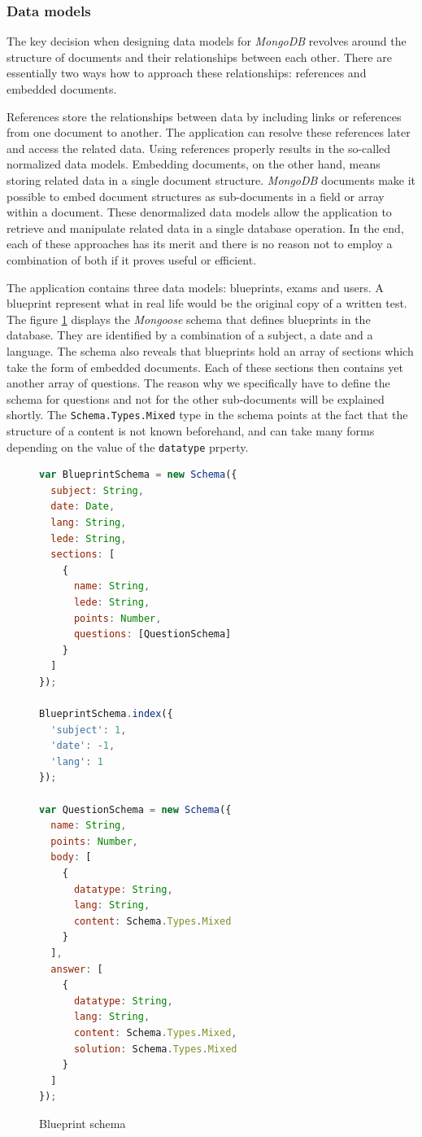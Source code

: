 \documentclass[thesis=M,english,hidelinks]{FITthesis}[2012/10/20]
\newcommand{\code}{\texttt}
\begin{document}
      \subsubsection{Data models}

The key decision when designing data models for \textit{MongoDB} revolves around the structure of documents and their relationships between each other. There are essentially two ways how to approach these relationships: references and embedded documents.

References store the relationships between data by including links or references from one document to another. The application can resolve these references later and access the related data. Using references properly results in the so-called normalized data models. Embedding documents, on the other hand, means storing related data in a single document structure. \textit{MongoDB} documents make it possible to embed document structures as sub-documents in a field or array within a document. These denormalized data models allow the application to retrieve and manipulate related data in a single database operation. In the end, each of these approaches has its merit and there is no reason not to employ a combination of both if it proves useful or efficient.

The application contains three data models: blueprints, exams and users. A blueprint represent what in real life would be the original copy of a written test. The figure \ref{fig:blueprint_schema} displays the \textit{Mongoose} schema that defines blueprints in the database. They are identified by a combination of a subject, a date and a language. The schema also reveals that blueprints hold an array of sections which take the form of embedded documents. Each of these sections then contains yet another array of questions. The reason why we specifically have to define the schema for questions and not for the other sub-documents will be explained shortly. The \code{Schema.Types.Mixed} type in the schema points at the fact that the structure of a content is not known beforehand, and can take many forms depending on the value of the \code{datatype} prperty.

\begin{figure}
  \begin{lstlisting}[language=JavaScript]
var BlueprintSchema = new Schema({
  subject: String,
  date: Date,
  lang: String,
  lede: String,
  sections: [
    {
      name: String,
      lede: String,
      points: Number,
      questions: [QuestionSchema]
    }
  ]
});

BlueprintSchema.index({
  'subject': 1,
  'date': -1,
  'lang': 1
});

var QuestionSchema = new Schema({
  name: String,
  points: Number,
  body: [
    {
      datatype: String,
      lang: String,
      content: Schema.Types.Mixed
    }
  ],
  answer: [
    {
      datatype: String,
      lang: String,
      content: Schema.Types.Mixed,
      solution: Schema.Types.Mixed
    }
  ]
});
  \end{lstlisting}
  \caption{Blueprint schema}
  \label{fig:blueprint_schema}
\end{figure}
\end{document}
